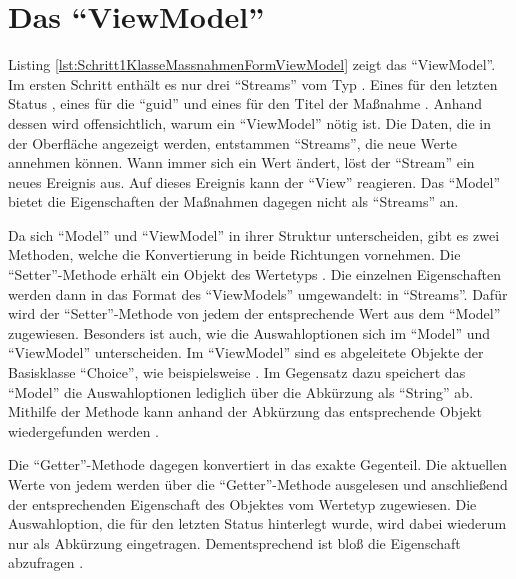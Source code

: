 

\ifodd\value{page}\hbox{}\newpage\fi
\section{Das \enquote{ViewModel}}
\label{sec:ViewModel}

Listing \ref{lst:Schritt1KlasseMassnahmenFormViewModel} zeigt das \enquote{ViewModel}.
Im ersten Schritt enthält es nur drei \enquote{Streams} vom Typ .
Eines für den letzten Status , eines für die \enquote{guid}  und eines für den Titel der Maßnahme .
Anhand dessen wird offensichtlich, warum ein \enquote{ViewModel} nötig ist.
Die Daten, die in der Oberfläche angezeigt werden, entstammen \enquote{Streams}, die neue Werte annehmen können.
Wann immer sich ein Wert ändert, löst der \enquote{Stream} ein neues Ereignis aus.
Auf dieses Ereignis kann der \enquote{View} reagieren.
Das \enquote{Model} bietet die Eigenschaften der Maßnahmen dagegen nicht als \enquote{Streams} an.

Da sich \enquote{Model} und \enquote{ViewModel} in ihrer Struktur unterscheiden, gibt es zwei Methoden, welche die Konvertierung in beide Richtungen vornehmen.
Die \enquote{Setter}-Methode   erhält ein Objekt des Wertetyps .
Die einzelnen Eigenschaften werden dann in das Format des \enquote{ViewModels} umgewandelt: in \enquote{Streams}.
Dafür wird der \enquote{Setter}-Methode  von jedem  der entsprechende Wert aus dem \enquote{Model} zugewiesen. 
Besonders ist auch, wie die Auswahloptionen sich im \enquote{Model} und \enquote{ViewModel} unterscheiden.
Im \enquote{ViewModel} sind es abgeleitete Objekte der Basisklasse \enquote{Choice}, wie beispielsweise  .  
Im Gegensatz dazu speichert das \enquote{Model} die Auswahloptionen lediglich über die Abkürzung als \enquote{String} ab.
Mithilfe der Methode  kann anhand der Abkürzung das entsprechende Objekt wiedergefunden werden .

Die \enquote{Getter}-Methode   dagegen konvertiert in das exakte Gegenteil.
Die aktuellen Werte von jedem  werden über die \enquote{Getter}-Methode  ausgelesen und anschließend der entsprechenden Eigenschaft des Objektes vom Wertetyp  zugewiesen.
Die Auswahloption, die für den letzten Status hinterlegt wurde, wird dabei wiederum nur als Abkürzung eingetragen.
Dementsprechend ist bloß die Eigenschaft  abzufragen .


